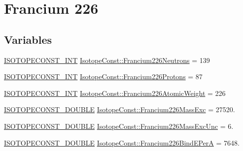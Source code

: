 \hypertarget{group___isotope_const-_francium-_fr226}{}\section{Francium 226}
\label{group___isotope_const-_francium-_fr226}
\subsection*{Variables}
\begin{DoxyCompactItemize}
\item 
\mbox{\hyperlink{group___isotope_const-_macros_ga5f18360b3e99483a35c32d789e62621c}{I\+S\+O\+T\+O\+P\+E\+C\+O\+N\+S\+T\+\_\+\+I\+NT}} \mbox{\hyperlink{group___isotope_const-_francium-_fr226_gab0020107c42804717427967e92d0709b}{Isotope\+Const\+::\+Francium226\+Neutrons}} = 139
\item 
\mbox{\hyperlink{group___isotope_const-_macros_ga5f18360b3e99483a35c32d789e62621c}{I\+S\+O\+T\+O\+P\+E\+C\+O\+N\+S\+T\+\_\+\+I\+NT}} \mbox{\hyperlink{group___isotope_const-_francium-_fr226_gae51e9bc274e31c49a639ebe36efad965}{Isotope\+Const\+::\+Francium226\+Protons}} = 87
\item 
\mbox{\hyperlink{group___isotope_const-_macros_ga5f18360b3e99483a35c32d789e62621c}{I\+S\+O\+T\+O\+P\+E\+C\+O\+N\+S\+T\+\_\+\+I\+NT}} \mbox{\hyperlink{group___isotope_const-_francium-_fr226_ga0069583a3822c50b64b4febb2f8abb1f}{Isotope\+Const\+::\+Francium226\+Atomic\+Weight}} = 226
\item 
\mbox{\hyperlink{group___isotope_const-_macros_ga8f45a7272ce02c0b4c65c44636ed719a}{I\+S\+O\+T\+O\+P\+E\+C\+O\+N\+S\+T\+\_\+\+D\+O\+U\+B\+LE}} \mbox{\hyperlink{group___isotope_const-_francium-_fr226_gaf4eae22486069862928b611445fc464c}{Isotope\+Const\+::\+Francium226\+Mass\+Exc}} = 27520.
\item 
\mbox{\hyperlink{group___isotope_const-_macros_ga8f45a7272ce02c0b4c65c44636ed719a}{I\+S\+O\+T\+O\+P\+E\+C\+O\+N\+S\+T\+\_\+\+D\+O\+U\+B\+LE}} \mbox{\hyperlink{group___isotope_const-_francium-_fr226_ga57c2587be519012cecc57438eca5393d}{Isotope\+Const\+::\+Francium226\+Mass\+Exc\+Unc}} = 6.
\item 
\mbox{\hyperlink{group___isotope_const-_macros_ga8f45a7272ce02c0b4c65c44636ed719a}{I\+S\+O\+T\+O\+P\+E\+C\+O\+N\+S\+T\+\_\+\+D\+O\+U\+B\+LE}} \mbox{\hyperlink{group___isotope_const-_francium-_fr226_gac672a1e46d7a861a10f3a66b97585d64}{Isotope\+Const\+::\+Francium226\+Bind\+E\+PerA}} = 7648.
\item 

\end{DoxyCompactItemize}
